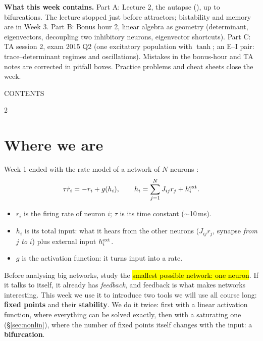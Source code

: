 \begin{plainbox}
\textbf{What this week contains.} Part A: Lecture 2, the autapse (), up to bifurcations. The lecture stopped just before attractors; bistability and memory are in Week 3.
Part B: Bonus hour 2, linear algebra as geometry (determinant, eigenvectors, decoupling two inhibitory neurons, eigenvector shortcuts).
Part C: TA session 2, exam 2015 Q2 (one excitatory population with $\tanh$; an E--I pair: trace--determinant regimes and oscillations).
Mistakes in the bonus-hour and TA notes are corrected in pitfall boxes. Practice problems and cheat sheets close the week.
\end{plainbox}

{\ttfamily\small\color{pgreen}CONTENTS}
\begin{multicols}{2}\footnotesize\setlength{\parskip}{0pt}
\setcounter{tocdepth}{1}
\makeatletter{}\makeatother
\end{multicols}


\section{Where we are}

Week 1 ended with the rate model of a network of $N$ neurons :
\[ \tau\dot r_i = -r_i + g(h_i),\qquad h_i = \sum_{j=1}^N J_{ij}r_j + h^{\text{ext}}_i. \]
\begin{itemize}
  \item $r_i$ is the firing rate of neuron $i$; $\tau$ is its time constant ($\sim$10\,ms).
  \item $h_i$ is its total input: what it hears from the other neurons ($J_{ij}r_j$, synapse \emph{from} $j$ \emph{to} $i$) plus external input $h^{\text{ext}}_i$.
  \item $g$ is the activation function: it turns input into a rate.
\end{itemize}

\begin{intuition}
Before analysing big networks, study the \hl{smallest possible network: one neuron}. If it talks to itself, it already has
\emph{feedback}, and feedback is what makes networks interesting. This week we use it to introduce two tools we will use all course long:
\textbf{fixed points} and their \textbf{stability}.
We do it twice: first with a linear activation function, where everything can be solved exactly, then with a saturating one (\S\ref{sec:nonlin}),
where the number of fixed points itself changes with the input: a \textbf{bifurcation}.
\end{intuition}

